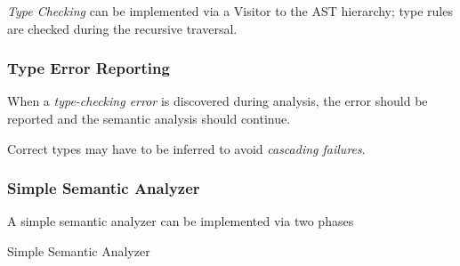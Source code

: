 \begin{definition}
    \textit{Type Checking} can be implemented via a Visitor to the AST hierarchy; type rules are checked during the recursive traversal.
\end{definition}

\subsubsection{Type Error Reporting}

\begin{definition}
    When a \textit{type-checking error} is discovered during analysis, the error should be reported and the semantic analysis should continue.
    
    Correct types may have to be inferred to avoid \textit{cascading failures}.
\end{definition}

\subsubsection{Simple Semantic Analyzer}

\begin{definition}
    A simple semantic analyzer can be implemented via two phases
    
    \begin{algorithm}[H]
        \begin{algorithmic}[1]
                    \State {}
                    \State {}
                \EndFor
                    \State {}
                    \State {}
                \EndFor
            \EndProcedure
                    \State {}
                        \State {}
                    \EndIf
                \EndFor
            \EndProcedure
                    \State {}
                    \State {}
                \EndFor
            \EndProcedure
        \end{algorithmic}
        \caption{Simple Semantic Analyzer}
        \label{algo:simple-semantic-analyzer}
    \end{algorithm}
\end{definition}
